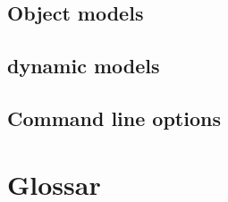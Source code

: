\documentclass[parskip=full]{scrartcl}
\begin{document}
\subsection{Object models}
\subsection{dynamic models}
\subsection{Command line options}

\section{Glossar}

%
\printnoidxglossaries
\end{document}
